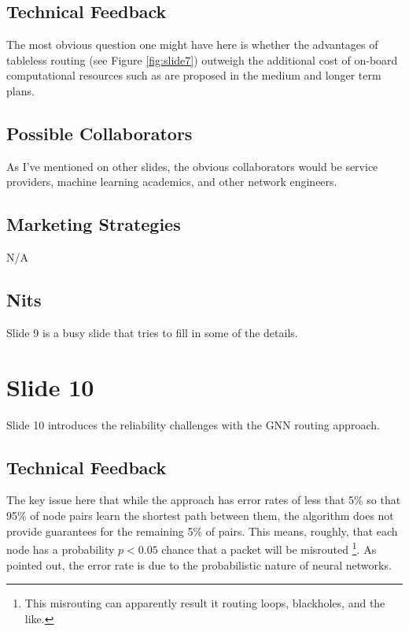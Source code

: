 \documentclass[11pt, oneside]{article}   	%
\begin{document}
\subsection{Technical Feedback}
\label{slide8:technical_feedback}
The most obvious question one might have here is whether the advantages of tableless routing (see Figure \ref{fig:slide7}) outweigh the additional
cost of on-board computational resources such as are proposed in the medium and longer term plans.


\subsection{Possible Collaborators}
\label{slide8:possible_collaborators}
As I've mentioned on other slides, the obvious collaborators would be service providers, machine learning academics, and other network engineers.

\subsection{Marketing Strategies}
\label{slide8:marketing_strategies}
N/A

\subsection{Nits}
\label{slide8:nits}
Slide 9 is a busy slide that tries to fill in some of the details. 



\section{Slide 10}
\label{sec:slide10}
Slide 10 introduces the reliability challenges with the GNN routing approach.


\subsection{Technical Feedback}
\label{slide10:technical_feedback}
The key issue here that while the approach has error rates of less that 5\% so that 95\% of node pairs learn the shortest path between them, the algorithm does
not provide guarantees for the remaining 5\% of pairs. This means, roughly, that each node has a probability $p < 0.05$ chance that a packet will be
misrouted \footnote{This misrouting can apparently result it routing loops, blackholes, and the like.}. As pointed out, the error rate is due to the probabilistic nature
of neural networks. 
\end{document}

